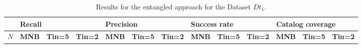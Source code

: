 \begin{table*}[]
	\small
\caption{Results for the entangled approach for the Dataset $Dt_{1}$.}
\begin{tabular}{|l | lll| lll |lll |lll|}
	\hline
	& \multicolumn{3}{l|}{\textbf{Recall}} & \multicolumn{3}{l|}{\textbf{Precision}} & \multicolumn{3}{l|}{\textbf{Success rate}} & \multicolumn{3}{l|}{ \textbf{Catalog coverage}} \\ \hline
	$N$  & \textbf{MNB}     & \textbf{Tin=5}   & \textbf{Tin=2}  & \textbf{MNB}      & \textbf{Tin=5 }   & \textbf{Tin=2}   & \textbf{MNB}       & \textbf{Tin=5 }   & \textbf{Tin=2}    & \textbf{MNB}        & \textbf{Tin=5 }     & \textbf{Tin=2}      \\ \hline
                   

\end{tabular}
\end{table*}
